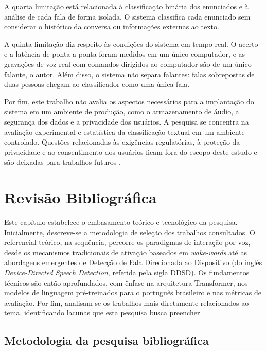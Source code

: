 \documentclass[
    12pt,                %
    openright,           %
    oneside,             %
    a4paper,             %
    english,             %
    brazil               %
]{abntex2}
\begin{document}
A quarta limitação está relacionada à classificação binária dos enunciados e à análise de cada fala de forma isolada. O sistema classifica cada enunciado sem considerar o histórico da conversa ou informações externas ao texto.

A quinta limitação diz respeito às condições do sistema em tempo real. O acerto e a latência de ponta a ponta foram medidos em um único computador, e as gravações de voz real com comandos dirigidos ao computador são de um único falante, o autor. Além disso, o sistema não separa falantes: falas sobrepostas de duas pessoas chegam ao classificador como uma única fala.

Por fim, este trabalho não avalia os aspectos necessários para a implantação do sistema em um ambiente de produção, como o armazenamento de áudio, a segurança dos dados e a privacidade dos usuários. A pesquisa se concentra na avaliação experimental e estatística da classificação textual em um ambiente controlado. Questões relacionadas às exigências regulatórias, à proteção da privacidade e ao consentimento dos usuários ficam fora do escopo deste estudo e são deixadas para trabalhos futuros \cite{Chen2021}.

\chapter{Revisão Bibliográfica}
\label{cap:revisao}

Este capítulo estabelece o embasamento teórico e tecnológico da pesquisa. Inicialmente, descreve-se a metodologia de seleção dos trabalhos consultados. O referencial teórico, na sequência, percorre os paradigmas de interação por voz, desde os mecanismos tradicionais de ativação baseados em \textit{wake-words} até as abordagens emergentes de Detecção de Fala Direcionada ao Dispositivo (do inglês \textit{Device-Directed Speech Detection}, referida pela sigla DDSD). Os fundamentos técnicos são então aprofundados, com ênfase na arquitetura Transformer, nos modelos de linguagem pré-treinados para o português brasileiro e nas métricas de avaliação. Por fim, analisam-se os trabalhos mais diretamente relacionados ao tema, identificando lacunas que esta pesquisa busca preencher.

\section{Metodologia da pesquisa bibliográfica}
\label{sec:metodologia_pesquisa}
\end{document}

